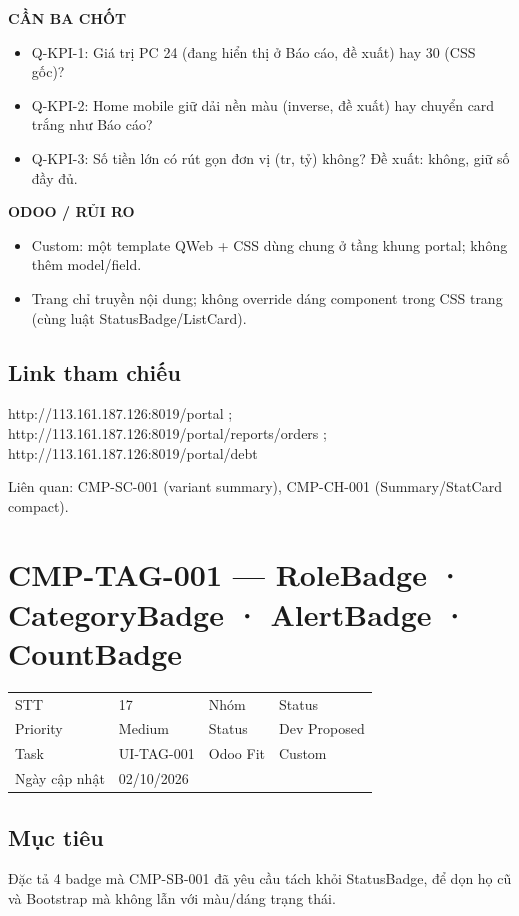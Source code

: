 \documentclass[11pt,a4paper]{report}
\begin{document}
\par\smallskip\textbf{CẦN BA CHỐT}\par
\begin{itemize}
\item Q-KPI-1: Giá trị PC 24 (đang hiển thị ở Báo cáo, đề xuất) hay 30 (CSS gốc)?
\item Q-KPI-2: Home mobile giữ dải nền màu (inverse, đề xuất) hay chuyển card trắng như Báo cáo?
\item Q-KPI-3: Số tiền lớn có rút gọn đơn vị (tr, tỷ) không? Đề xuất: không, giữ số đầy đủ.
\end{itemize}

\par\smallskip\textbf{ODOO / RỦI RO}\par
\begin{itemize}
\item Custom: một template QWeb + CSS dùng chung ở tầng khung portal; không thêm model/\allowbreak{}field.
\item Trang chỉ truyền nội dung; không override dáng component trong CSS trang (cùng luật StatusBadge/\allowbreak{}ListCard).
\end{itemize}
\subsection*{Link tham chiếu}
http://113.161.187.126:8019/\allowbreak{}portal ; http://113.161.187.126:8019/\allowbreak{}portal/\allowbreak{}reports/\allowbreak{}orders ; http://113.161.187.126:8019/\allowbreak{}portal/\allowbreak{}debt\par
Liên quan: CMP-SC-001 (variant summary), CMP-CH-001 (Summary/\allowbreak{}StatCard compact).\par
\clearpage
\section{CMP-TAG-001 --- RoleBadge · CategoryBadge · AlertBadge · CountBadge}
\begin{tabularx}{\textwidth}{@{}l X l X@{}}\toprule
STT & 17 & Nhóm & Status\\
Priority & Medium & Status & Dev Proposed\\
Task & UI-TAG-001 & Odoo Fit & Custom\\
Ngày cập nhật & 02/10/2026 & & \\\bottomrule\end{tabularx}
\subsection*{Mục tiêu}
Đặc tả 4 badge mà CMP-SB-001 đã yêu cầu tách khỏi StatusBadge, để dọn họ  cũ và Bootstrap  mà không lẫn với màu/\allowbreak{}dáng trạng thái.\par
\end{document}
